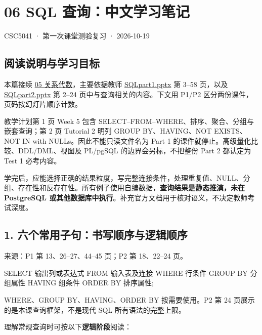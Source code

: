 \clearpage
\section{06 SQL 查询：中文学习笔记}\label{06_sql_queries_zh}

CSC5041 · 第一次课堂测验复习 · 2026-10-19

\subsection{阅读说明与学习目标}\label{06_sql_queries_zh-ux9605ux8bfbux8bf4ux660eux4e0eux5b66ux4e60ux76eeux6807}

本篇接续 \hyperref[05_relational_algebra_zh]{05 关系代数}，主要依据教师 \href{../../../slides/SQLpart1.pptx}{SQLpart1.pptx} 第 3--58 页，以及 \href{../../../slides/SQLpart2.pptx}{SQLpart2.pptx} 第 2--24 页中与查询相关的内容。下文用 P1/P2 区分两份课件，页码按幻灯片顺序计数。

教学计划第 1 页 Week 5 包含 SELECT--FROM--WHERE、排序、聚合、分组与嵌套查询；第 2 页 Tutorial 2 明列 GROUP BY、HAVING、NOT EXISTS、NOT IN with NULLs。因此不能只读文件名为 Part 1 的课件就停止。高级量化比较、DDL/DML、视图及 PL/pgSQL 的边界会另标，不把整份 Part 2 都认定为 Test 1 必考内容。

学完后，应能选择正确的结果粒度，写完整连接条件，处理重复值、NULL、分组、存在性和反存在性。所有例子使用自编数据，\textbf{查询结果是静态推演，未在 PostgreSQL 或其他数据库中执行}。补充官方文档用于核对语义，不决定教师考试深度。

\Needspace{11cm}
\subsection{1. 六个常用子句：书写顺序与逻辑顺序}\label{06_sql_queries_zh-ux516dux4e2aux5e38ux7528ux5b50ux53e5ux4e66ux5199ux987aux5e8fux4e0eux903bux8f91ux987aux5e8f}


来源：P1 第 13、26--27、44--45 页；P2 第 18、22--24 页。

\begin{StudyCode}
SELECT 输出列或表达式
FROM 输入表及连接
WHERE 行条件
GROUP BY 分组属性
HAVING 组条件
ORDER BY 排序属性;
\end{StudyCode}

WHERE、GROUP BY、HAVING、ORDER BY 按需要使用。P2 第 24 页展示的是本课查询框架，不是现代 SQL 所有语法的完整上限。

理解常规查询时可按以下\textbf{逻辑阶段}阅读：


